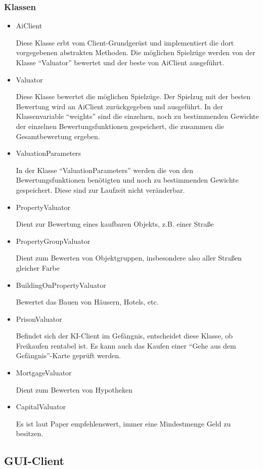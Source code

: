\documentclass[a4paper,10pt]{article}
\begin{document}
\subsubsection{Klassen}
\begin{itemize}
\item AiClient

Diese Klasse erbt vom Client-Grundgerüst und implementiert die dort vorgegebenen abstrakten Methoden. Die möglichen Spielzüge werden von der Klasse "`Valuator"' bewertet und der beste von AiClient ausgeführt.
\item Valuator

Diese Klasse bewertet die möglichen Spielzüge. Der Spielzug mit der besten Bewertung wird an AiClient zurückgegeben und ausgeführt.
In der Klassenvariable "`weights"' sind die einzelnen, noch zu bestimmenden Gewichte der einzelnen Bewertungsfunktionen gespeichert, die zusammen die Gesamtbewertung ergeben.
\item ValuationParameters

In der Klasse "`ValuationParameters"' werden die von den Bewertungsfunktionen benötigten und noch zu bestimmenden Gewichte gespeichert. Diese sind zur Laufzeit nicht veränderbar.
\item PropertyValuator

Dient zur Bewertung eines kaufbaren Objekts, z.B. einer Straße
\item PropertyGroupValuator

Dient zum Bewerten von Objektgruppen, insbesondere also aller Straßen gleicher Farbe
\item BuildingOnPropertyValuator

Bewertet das Bauen von Häusern, Hotels, etc.
\item PrisonValuator

Befindet sich der KI-Client im Gefängnis, entscheidet diese Klasse, ob Freikaufen rentabel ist. Es kann auch das Kaufen einer "`Gehe aus dem Gefängnis"'-Karte geprüft werden.
\item MortgageValuator

Dient zum Bewerten von Hypotheken
\item CapitalValuator

Es ist laut Paper empfehlenswert, immer eine Mindestmenge Geld zu besitzen.
\end{itemize}


\subsection{GUI-Client}
\end{document}
